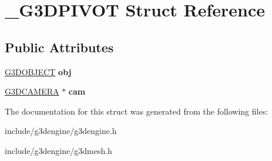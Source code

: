 \hypertarget{struct__G3DPIVOT}{}\section{\+\_\+\+G3\+D\+P\+I\+V\+OT Struct Reference}
\label{struct__G3DPIVOT}
\subsection*{Public Attributes}
\begin{DoxyCompactItemize}
\item 
\mbox{\label{struct__G3DPIVOT_a0a59195cb6d5896f9783c153db91834a}} 
\hyperlink{struct__G3DOBJECT}{G3\+D\+O\+B\+J\+E\+CT} {\bfseries obj}
\item 
\mbox{\label{struct__G3DPIVOT_a4ce0806260ad6f94885122bb7e338290}} 
\hyperlink{struct__G3DCAMERA}{G3\+D\+C\+A\+M\+E\+RA} $\ast$ {\bfseries cam}
\end{DoxyCompactItemize}


The documentation for this struct was generated from the following files\+:\begin{DoxyCompactItemize}
\item 
include/g3dengine/g3dengine.\+h\item 
include/g3dengine/g3dmesh.\+h\end{DoxyCompactItemize}
